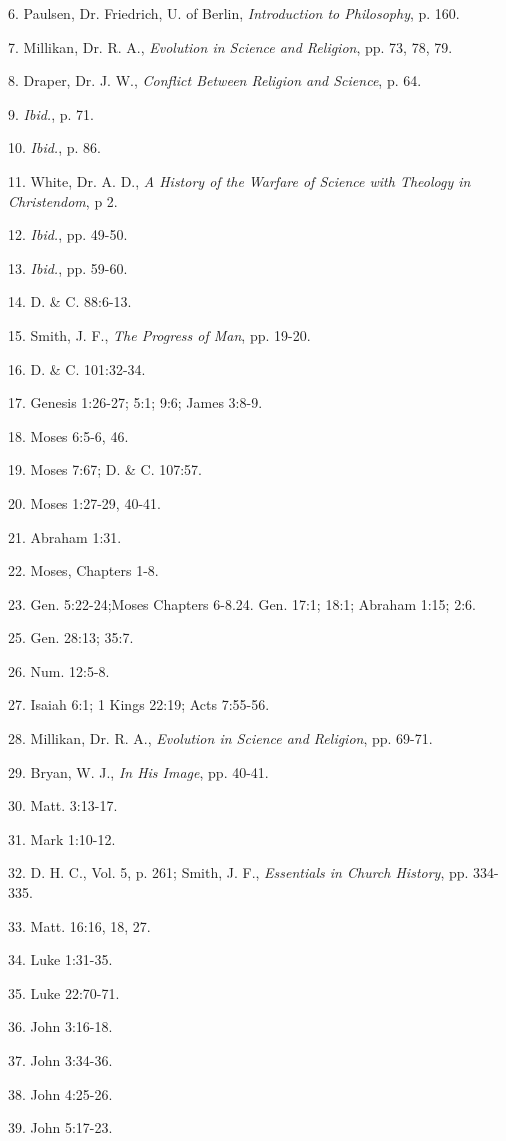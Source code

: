 6. Paulsen, Dr. Friedrich, U. of Berlin, \textit{Introduction to Philosophy}, p. 160.

7. Millikan, Dr. R. A., \textit{Evolution in Science and Religion}, pp. 73, 78, 79.

8. Draper, Dr. J. W., \textit{Conflict Between Religion and Science}, p. 64.

9. \textit{Ibid.}, p. 71.

10. \textit{Ibid.}, p. 86.

11. White, Dr. A. D., \textit{A History of the Warfare of Science with Theology in Christendom}, p 2.

12. \textit{Ibid.}, pp. 49-50.

13. \textit{Ibid.}, pp. 59-60.

14. D. \& C. 88:6-13.

15. Smith, J. F., \textit{The Progress of Man}, pp. 19-20.

16. D. \& C. 101:32-34.

17. Genesis 1:26-27; 5:1; 9:6; James 3:8-9.

18. Moses 6:5-6, 46.

19. Moses 7:67; D. \& C. 107:57.

20. Moses 1:27-29, 40-41.

21. Abraham 1:31.

22. Moses, Chapters 1-8.

23. Gen. 5:22-24;Moses Chapters 6-8.24. Gen. 17:1; 18:1; Abraham 1:15; 2:6.

25. Gen. 28:13; 35:7.

26. Num. 12:5-8.

27. Isaiah 6:1; 1 Kings 22:19; Acts 7:55-56.

28. Millikan, Dr. R. A., \textit{Evolution in Science and Religion}, pp. 69-71.

29. Bryan, W. J., \textit{In His Image}, pp. 40-41.

30. Matt. 3:13-17.

31. Mark 1:10-12.

32. D. H. C., Vol. 5, p. 261; Smith, J. F., \textit{Essentials in Church History}, pp. 334-335.

33. Matt. 16:16, 18, 27.

34. Luke 1:31-35.

35. Luke 22:70-71.

36. John 3:16-18.

37. John 3:34-36.

38. John 4:25-26.

39. John 5:17-23.

